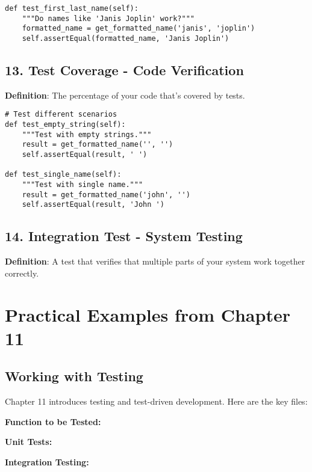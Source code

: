 \begin{lstlisting}
def test_first_last_name(self):
    """Do names like 'Janis Joplin' work?"""
    formatted_name = get_formatted_name('janis', 'joplin')
    self.assertEqual(formatted_name, 'Janis Joplin')
\end{lstlisting}

\subsection*{13. Test Coverage - Code Verification}
\textbf{Definition}: The percentage of your code that's covered by tests.

\begin{lstlisting}
# Test different scenarios
def test_empty_string(self):
    """Test with empty strings."""
    result = get_formatted_name('', '')
    self.assertEqual(result, ' ')

def test_single_name(self):
    """Test with single name."""
    result = get_formatted_name('john', '')
    self.assertEqual(result, 'John ')
\end{lstlisting}

\subsection*{14. Integration Test - System Testing}
\textbf{Definition}: A test that verifies that multiple parts of your system work together correctly.



\section*{Practical Examples from Chapter 11}

\subsection*{Working with Testing}
Chapter 11 introduces testing and test-driven development. Here are the key files:

\textbf{Function to be Tested:}


\textbf{Unit Tests:}


\textbf{Integration Testing:}


